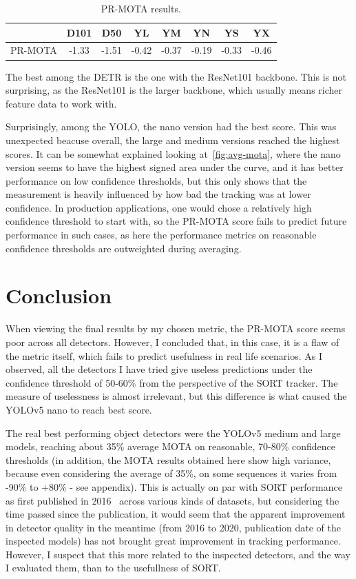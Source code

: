 \begin{table}[h]
    \centering
    \begin{tabular}{|c|c|c|c|c|c|c|c|}
        \hline
        & D101 & D50 & YL& YM & YN & YS & YX \\
        \hline
        PR-MOTA & -1.33 & -1.51 & -0.42 & -0.37 & -0.19 & -0.33 & -0.46 \\
        \hline
    \end{tabular}
    \caption{PR-MOTA results.}
\label{tab:pr-mota}
\end{table}

The best among the DETR is the one with the ResNet101 backbone. This is not surprising, as the ResNet101 is the larger backbone, which usually means richer feature data to work with.  

Surprisingly, among the YOLO, the nano version had the best score. This was unexpected beacuse overall, the large and medium versions reached the highest scores. It can be somewhat explained looking at~\ref{fig:avg-mota}, where the nano version seems to have the highest signed area under the curve, and it has better performance on low confidence thresholds, but this only shows that the measurement is heavily influenced by how bad the tracking was at lower confidence. In production applications, one would chose a relatively high confidence threshold to start with, so the PR-MOTA score fails to predict future performance in such cases, as here the performance metrics on reasonable confidence thresholds are outweighted during averaging.



\section{Conclusion}

When viewing the final results by my chosen metric, the PR-MOTA score seems poor across all detectors. However, I concluded that, in this case, it is a flaw of the metric itself, which fails to predict usefulness in real life scenarios. As I observed, all the detectors I have tried give useless predictions under the confidence threshold of 50-60\% from the perspective of the SORT tracker. The measure of uselessness is almost irrelevant, but this difference is what caused the YOLOv5 nano to reach best score.

The real best performing object detectors were the YOLOv5 medium and large models, reaching about 35\% average MOTA on reasonable, 70-80\% confidence thresholds (in addition, the MOTA results obtained here show high variance, because even considering the average of 35\%, on some sequences it varies from -90\% to +80\% - see appendix). This is actually on par with SORT performance as first published in 2016~\cite{Bewley_2016} across various kinds of datasets, but considering the time passed since the publication, it would seem that the apparent improvement in detector quality in the meantime (from 2016 to 2020, publication date of the inspected models) has not brought great improvement in tracking performance. However, I suspect that this more related to the inspected detectors, and the way I evaluated them, than to the usefullness of SORT.


